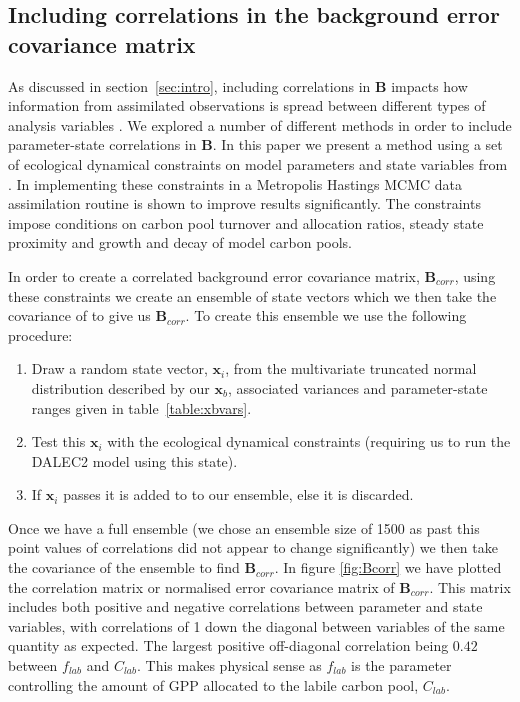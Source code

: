 \documentclass[11pt]{article}
\begin{document}
\subsection{Including correlations in the background error covariance matrix} \label{sec:corB}

As discussed in section~\ref{sec:intro}, including correlations in \textbf{B} impacts how information from assimilated observations is spread between different types of analysis variables \citep{bannister2008review}. We explored a number of different methods in order to include parameter-state correlations in \textbf{B}. In this paper we present a method using a set of ecological dynamical constraints on model parameters and state variables from \citet{Bloom2015}. In \citet{Bloom2015} implementing these constraints in a Metropolis Hastings MCMC data assimilation routine is shown to improve results significantly. The constraints impose conditions on carbon pool turnover and allocation ratios, steady state proximity and growth and decay of model carbon pools.

In order to create a correlated background error covariance matrix, $\textbf{B}_{corr}$, using these constraints we create an ensemble of state vectors which we then take the covariance of to give us $\textbf{B}_{corr}$. To create this ensemble we use the following procedure:
\begin{enumerate}
\item Draw a random state vector, $\textbf{x}_i$, from the multivariate truncated normal distribution described by our $\textbf{x}_b$, associated variances and parameter-state ranges given in table~\ref{table:xbvars}.
\item Test this $\textbf{x}_i$ with the ecological dynamical constraints (requiring us to run the DALEC2 model using this state).
\item If $\textbf{x}_i$ passes it is added to to our ensemble, else it is discarded.
\end{enumerate}
Once we have a full ensemble (we chose an ensemble size of 1500 as past this point values of correlations did not appear to change significantly) we then take the covariance of the ensemble to find $\textbf{B}_{corr}$. In figure \ref{fig:Bcorr} we have plotted the correlation matrix or normalised error covariance matrix of $\textbf{B}_{corr}$. This matrix includes both positive and negative correlations between parameter and state variables, with correlations of 1 down the diagonal between variables of the same quantity as expected. The largest positive off-diagonal correlation being $0.42$ between $f_{lab}$ and $C_{lab}$. This makes physical sense as $f_{lab}$ is the parameter controlling the amount of GPP allocated to the labile carbon pool, $C_{lab}$.
\end{document}
